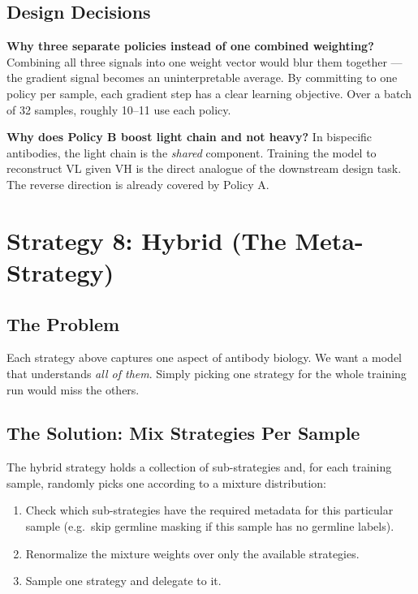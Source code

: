 \documentclass[11pt]{article}
\begin{document}
\subsection{Design Decisions}

\textbf{Why three separate policies instead of one combined
weighting?}
Combining all three signals into one weight vector would blur
them together --- the gradient signal becomes an uninterpretable
average. By committing to one policy per sample, each gradient
step has a clear learning objective. Over a batch of 32 samples,
roughly 10--11 use each policy.

\textbf{Why does Policy B boost light chain and not heavy?}
In bispecific antibodies, the light chain is the \emph{shared}
component. Training the model to reconstruct VL given VH is
the direct analogue of the downstream design task. The reverse
direction is already covered by Policy A.

\section{Strategy 8: Hybrid (The Meta-Strategy)}
\label{sec:hybrid}

\subsection{The Problem}
Each strategy above captures one aspect of antibody biology.
We want a model that understands \emph{all of them}. Simply
picking one strategy for the whole training run would miss the
others.

\subsection{The Solution: Mix Strategies Per Sample}
The hybrid strategy holds a collection of sub-strategies and,
for each training sample, randomly picks one according to a
mixture distribution:

\begin{enumerate}
\item Check which sub-strategies have the required metadata for
      this particular sample (e.g.\ skip germline masking if this
      sample has no germline labels).
\item Renormalize the mixture weights over only the available
      strategies.
\item Sample one strategy and delegate to it.
\end{enumerate}
\end{document}
